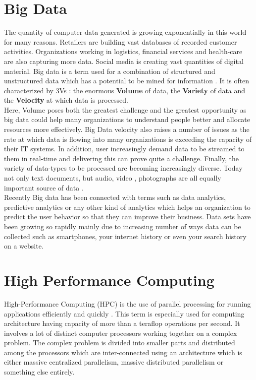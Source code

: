 \documentclass[sigconf]{acmart}
\begin{document}
\section{Big Data}
The quantity of computer data generated is growing exponentially in this world for many reasons. Retailers are building vast databases of recorded customer activities. Organizations working in logistics, financial services and health-care are also capturing more data. Social media is creating vast quantities of digital material. Big data is a term used for a combination of structured and unstructured data which has a potential to be mined for information \cite{bigdatawiki}. It is often characterized by 3Vs : the enormous \textbf{Volume} of data, the \textbf{Variety} of data and the \textbf{Velocity} at which data is processed. \\
Here, Volume poses both the greatest challenge and the greatest opportunity as big data could help  many organizations to understand people better and allocate resources more effectively. Big Data velocity also raises a number of issues as the rate at which data is flowing into many organizations is exceeding the capacity of their IT systems. In addition, user increasingly demand data to be streamed to them in real-time and delivering this can prove quite a challenge. Finally, the variety of data-types to be processed are becoming increasingly diverse. Today not only text documents, but audio, video , photographs are all equally important source of data \cite{bigdatawiki}.
\\
Recently Big data has been connected with terms such as data analytics, predictive analytics or any other kind of analytics which helps an organization to predict the user behavior so that they can improve their business. Data sets have been growing so rapidly mainly due to increasing number of ways data can be collected such as smartphones, your internet history or even your search history on a website.

\section{High Performance Computing}
High-Performance Computing (HPC) is the use of parallel processing for running applications efficiently and quickly \cite{lee2004history}. This term is especially used for computing architecture having capacity of more than a teraflop operations per second. It involves a lot of distinct computer processors working together on a complex problem. The complex problem is divided into smaller parts and distributed among the processors which are inter-connected using an architecture which is either massive centralized parallelism, massive distributed parallelism or something else entirely. 
\end{document}
